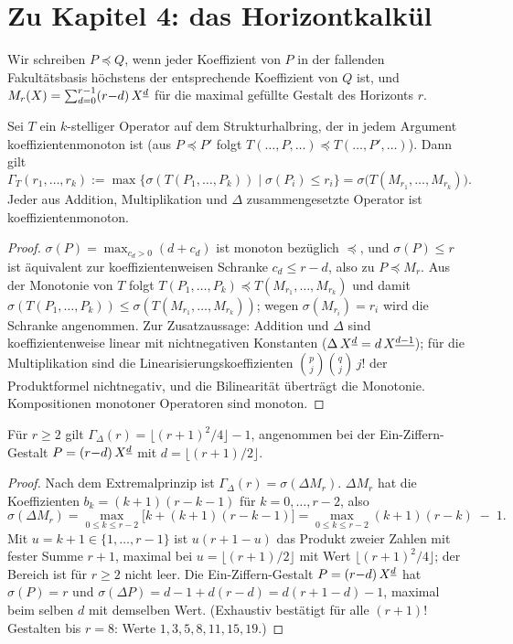 \section*{Zu Kapitel 4: das Horizontkalkül}

Wir schreiben $P\preceq Q$, wenn jeder Koeffizient von $P$ in der
fallenden Fakultätsbasis höchstens der entsprechende Koeffizient von
$Q$ ist, und $M_r(X)=\sum_{d=0}^{r-1}(r{-}d)\,X^{\underline{d}}$ für die maximal
gefüllte Gestalt des Horizonts $r$.

\begin{satz}
Sei $T$ ein $k$-stelliger Operator auf dem Strukturhalbring, der in
jedem Argument koeffizientenmonoton ist (aus $P\preceq P'$ folgt
$T(\ldots,P,\ldots)\preceq T(\ldots,P',\ldots)$). Dann gilt
\[
\Gamma_T(r_1,\ldots,r_k)
:=\max\{\sigma(T(P_1,\ldots,P_k)) \mid \sigma(P_i)\le r_i\}
=\sigma\bigl(T(M_{r_1},\ldots,M_{r_k})\bigr).
\]
Jeder aus Addition, Multiplikation und $\Delta$ zusammengesetzte
Operator ist koeffizientenmonoton.
\end{satz}

\begin{proof}
$\sigma(P)=\max_{c_d>0}(d+c_d)$ ist monoton bezüglich $\preceq$, und
$\sigma(P)\le r$ ist äquivalent zur koeffizientenweisen Schranke
$c_d\le r-d$, also zu $P\preceq M_r$. Aus der Monotonie von $T$
folgt $T(P_1,\ldots,P_k)\preceq T(M_{r_1},\ldots,M_{r_k})$ und damit
$\sigma(T(P_1,\ldots,P_k))\le\sigma(T(M_{r_1},\ldots,M_{r_k}))$;
wegen $\sigma(M_{r_i})=r_i$ wird die Schranke angenommen. Zur
Zusatzaussage: Addition und $\Delta$ sind koeffizientenweise linear
mit nichtnegativen Konstanten ($\Delta\,X^{\underline{d}}=d\,X^{\underline{d-1}}$); für
die Multiplikation sind die Linearisierungskoeffizienten
$\binom pj\binom qj\,j!$ der Produktformel nichtnegativ, und die
Bilinearität überträgt die Monotonie. Kompositionen monotoner
Operatoren sind monoton.
\end{proof}

\begin{satz}
Für $r\ge2$ gilt
$\Gamma_\Delta(r)=\bigl\lfloor(r+1)^2/4\bigr\rfloor-1$,
angenommen bei der Ein-Ziffern-Gestalt $P=(r{-}d)\,X^{\underline{d}}$ mit
$d=\lfloor(r+1)/2\rfloor$.
\end{satz}

\begin{proof}
Nach dem Extremalprinzip ist $\Gamma_\Delta(r)=\sigma(\Delta M_r)$.
$\Delta M_r$ hat die Koeffizienten $b_k=(k{+}1)(r{-}k{-}1)$ für
$k=0,\ldots,r{-}2$, also
\[
\sigma(\Delta M_r)
=\max_{0\le k\le r-2}\bigl[k+(k{+}1)(r{-}k{-}1)\bigr]
=\max_{0\le k\le r-2}(k{+}1)(r{-}k)\;-\;1 .
\]
Mit $u=k{+}1\in\{1,\ldots,r{-}1\}$ ist $u(r{+}1{-}u)$ das Produkt
zweier Zahlen mit fester Summe $r{+}1$, maximal bei
$u=\lfloor(r{+}1)/2\rfloor$ mit Wert
$\lfloor(r{+}1)^2/4\rfloor$; der Bereich ist für $r\ge2$ nicht leer.
Die Ein-Ziffern-Gestalt $P=(r{-}d)\,X^{\underline{d}}$ hat $\sigma(P)=r$ und
$\sigma(\Delta P)=d-1+d(r{-}d)=d(r{+}1{-}d)-1$, maximal beim selben
$d$ mit demselben Wert. (Exhaustiv bestätigt für alle $(r{+}1)!$
Gestalten bis $r=8$: Werte $1,3,5,8,11,15,19$.)
\end{proof}

